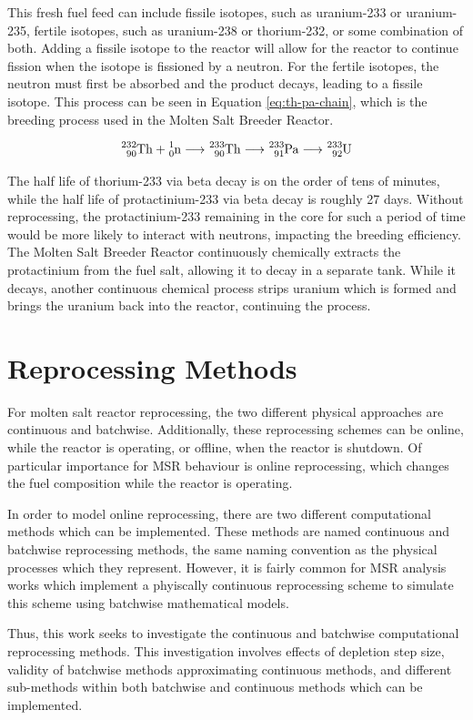 This fresh fuel feed can include fissile isotopes, such as uranium-233 or uranium-235, fertile isotopes, such as uranium-238 or thorium-232, or some combination of both. Adding a fissile isotope to the reactor will allow for the reactor to continue fission when the isotope is fissioned by a neutron. For the fertile isotopes, the neutron must first be absorbed and the product decays, leading to a fissile isotope. This process can be seen in Equation \eqref{eq:th-pa-chain}, which is the breeding process used in the Molten Salt Breeder Reactor.

\begin{equation} \hfill
\ce{^{232}_{90}Th} + \ce{^{1}_{0}n} \longrightarrow \ce{^{233}_{90}Th} \longrightarrow \ce{^{233}_{91}Pa} \longrightarrow \ce{^{233}_{92}U}
\hfill\label{eq:th-pa-chain} \end{equation}

The half life of thorium-233 via beta decay is on the order of tens of minutes, while the half life of protactinium-233 via beta decay is roughly 27 days. Without reprocessing, the protactinium-233 remaining in the core for such a period of time would be more likely to interact with neutrons, impacting the breeding efficiency. The Molten Salt Breeder Reactor continuously chemically extracts the protactinium from the fuel salt, allowing it to decay in a separate tank. While it decays, another continuous chemical process strips uranium which is formed and brings the uranium back into the reactor, continuing the process.

\section{Reprocessing Methods}

For molten salt reactor reprocessing, the two different physical approaches are continuous and batchwise. Additionally, these reprocessing schemes can be online, while the reactor is operating, or offline, when the reactor is shutdown. Of particular importance for MSR behaviour is online reprocessing, which changes the fuel composition while the reactor is operating.

In order to model online reprocessing, there are two different computational methods which can be implemented. These methods are named continuous and batchwise reprocessing methods, the same naming convention as the physical processes which they represent. However, it is fairly common for MSR analysis works which implement a phyiscally continuous reprocessing scheme to simulate this scheme using batchwise mathematical models.

Thus, this work seeks to investigate the continuous and batchwise computational reprocessing methods. This investigation involves effects of depletion step size, validity of batchwise methods approximating continuous methods, and different sub-methods within both batchwise and continuous methods which can be implemented.
